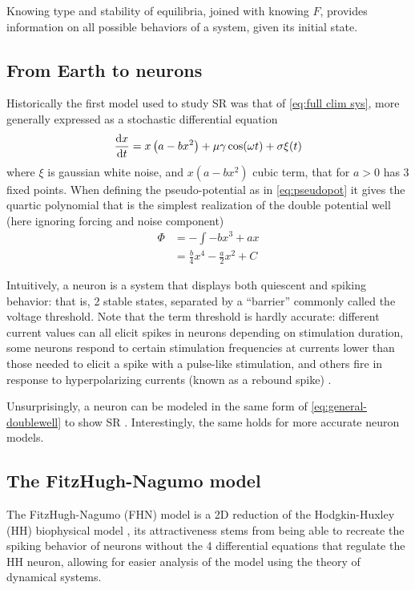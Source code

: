 Knowing type and stability of equilibria, joined with knowing $F$, provides information on all possible behaviors of a system, given its initial state. 

\subsection{From Earth to neurons}
Historically the first model used to study SR was that of \ref{eq:full clim sys}, more generally expressed as a stochastic differential equation \parencite{benziMechanismStochasticResonance1981}
\begin{equation}
    \label{eq:general-doublewell}
    \odv{x}{t} = x\left(a - bx^2\right) + \mu \gamma \cos(\omega t) + \sigma\xi(t)
\end{equation}
where $\xi$ is gaussian white noise, and $x(a-bx^2)$ cubic term, that for $a>0$ has 3 fixed points. When defining the pseudo-potential as in \ref{eq:pseudopot} it gives the quartic polynomial that is the simplest realization of the double potential well (here ignoring forcing and noise component)
\begin{align*}
    \Phi &= - \int - bx^3 + ax \\
    &= \frac{b}{4}x^4 - \frac{a}{2}x^2 + C
\end{align*}

Intuitively, a neuron is a system that displays both quiescent and spiking behavior: that is, 2 stable states, separated by a \enquote{barrier} commonly called the voltage threshold. 
Note that the term threshold is hardly accurate: different current values can all elicit spikes in neurons depending on stimulation duration, some neurons respond to certain stimulation frequencies at currents lower than those needed to elicit a spike with a pulse-like stimulation, and others fire in response to hyperpolarizing currents (known as a rebound spike) \cite[Chapter~7]{izhikevichDynamicalSystemsNeuroscience2006}.

Unsurprisingly, a neuron can be modeled in the same form of \ref{eq:general-doublewell} to show SR \parencite{bulsaraStochasticResonanceSingle1991}. 
Interestingly, the same holds for more accurate neuron models.

\subsection{The FitzHugh-Nagumo model}
\label{sec:fhn}
The FitzHugh-Nagumo (FHN) model \parencite{fitzhughImpulsesPhysiologicalStates1961,izhikevichFitzHughNagumoModel2006} is a 2D reduction of the Hodgkin-Huxley (HH) biophysical model \parencite{hodgkinQuantitativeDescriptionMembrane1952}, its attractiveness stems from being able to recreate the spiking behavior of neurons without the 4 differential equations that regulate the HH neuron, allowing for easier analysis of the model using the theory of dynamical systems. 

